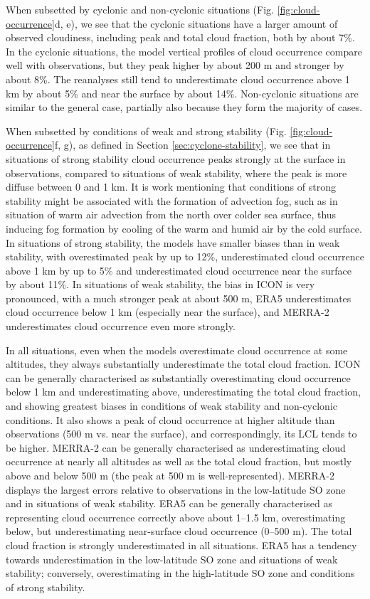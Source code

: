 \documentclass[draft]{agujournal2019}
\begin{document}
When subsetted by cyclonic and non-cyclonic situations (Fig.
\ref{fig:cloud-occurrence}d, e), we see that the cyclonic situations have a
larger amount of observed cloudiness, including peak and total cloud fraction,
both by about 7\%.  In the cyclonic situations, the model vertical profiles of
cloud occurrence compare well with observations, but they peak higher by about
200 m and stronger by about 8\%. The reanalyses still tend to underestimate
cloud occurrence above 1 km by about 5\% and near the surface by about 14\%.
Non-cyclonic situations are similar to the general case, partially also because
they form the majority of cases.

When subsetted by conditions of weak and strong stability (Fig.
\ref{fig:cloud-occurrence}f, g), as defined in Section
\ref{sec:cyclone-stability}, we see that in situations of strong stability
cloud occurrence peaks strongly at the surface in observations, compared to
situations of weak stability, where the peak is more diffuse between 0 and 1
km.  It is work mentioning that conditions of strong stability might be
associated with the formation of advection fog, such as in situation of warm
air advection from the north over colder sea surface, thus inducing fog
formation by cooling of the warm and humid air by the cold surface.  In
situations of strong stability, the models have smaller biases than in weak
stability, with overestimated peak by up to 12\%, underestimated cloud
occurrence above 1 km by up to 5\% and underestimated cloud occurrence near the
surface by about 11\%.  In situations of weak stability, the bias in ICON is
very pronounced, with a much stronger peak at about 500 m, ERA5 underestimates
cloud occurrence below 1 km (especially near the surface), and MERRA-2
underestimates cloud occurrence even more strongly.

In all situations, even when the models overestimate cloud occurrence at some
altitudes, they always substantially underestimate the total cloud fraction.
ICON can be generally characterised as substantially overestimating cloud
occurrence below 1 km and underestimating above, underestimating the total
cloud fraction, and showing greatest biases in conditions of weak stability and
non-cyclonic conditions. It also shows a peak of cloud occurrence at higher
altitude than observations (500 m vs. near the surface), and correspondingly,
its LCL tends to be higher. MERRA-2 can be generally characterised as
underestimating cloud occurrence at nearly all altitudes as well as the total
cloud fraction, but mostly above and below 500 m (the peak at 500 m is
well-represented). MERRA-2 displays the largest errors relative to observations
in the low-latitude SO zone and in situations of weak stability. ERA5 can be
generally characterised as representing cloud occurrence correctly above about
1--1.5 km, overestimating below, but underestimating near-surface cloud
occurrence (0--500 m). The total cloud fraction is strongly underestimated in
all situations. ERA5 has a tendency towards underestimation in the low-latitude
SO zone and situations of weak stability; conversely, overestimating in the
high-latitude SO zone and conditions of strong stability.
\end{document}
